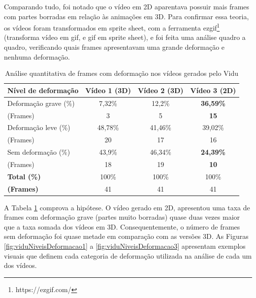 Comparando tudo, foi notado que o vídeo em 2D aparentava possuir mais frames com partes borradas em relação às animações em 3D. Para confirmar essa teoria, os vídeos foram transformados em sprite sheet, com a ferramenta ezgif\footnote{https://ezgif.com/} (transforma vídeo em gif, e gif em sprite sheet), e foi feita uma análise quadro a quadro, verificando quais frames apresentavam uma grande deformação e nenhuma deformação.

\begin{table}[htbp]
    \centering
    \caption{Análise quantitativa de frames com deformação nos vídeos gerados pelo Vidu}
    \label{tab:viduDeformacoes}
    \begin{tabular}{l c c c}
        \toprule
        \textbf{Nível de deformação} & \textbf{Vídeo 1 (3D)} & \textbf{Vídeo 2 (3D)} & \textbf{Vídeo 3 (2D)} \\
        \midrule
        Deformação grave (\%) & 7,32\% & 12,2\% & \textbf{36,59\%} \\
        (Frames) & 3 &  5 & \textbf{15} \\
        \midrule
        Deformação leve (\%) & 48,78\%  & 41,46\% & 39,02\% \\
        (Frames)& 20 & 17 & 16 \\
        \midrule
        Sem deformação (\%) & 43,9\% & 46,34\% & \textbf{24,39\%} \\
        (Frames)&18 & 19 & \textbf{10}\\
        \midrule
        \textbf{Total (\%)} & 100\% & 100\% & 100\%  \\
        \textbf{(Frames)} & 41 & 41 & 41 \\
        \bottomrule
    \end{tabular}
\end{table}

A Tabela \ref{tab:viduDeformacoes} comprova a hipótese. O vídeo gerado em 2D, apresentou uma taxa de frames com deformação grave (partes muito borradas) quase duas vezes maior que a taxa somada dos vídeos em 3D. Consequentemente, o número de frames sem deformação foi quase metade em comparação com as versões 3D. As Figuras \ref{fig:viduNiveisDeformacao1} a \ref{fig:viduNiveisDeformacao3} apresentam exemplos visuais que definem cada categoria de deformação utilizada na análise de cada um dos vídeos.

